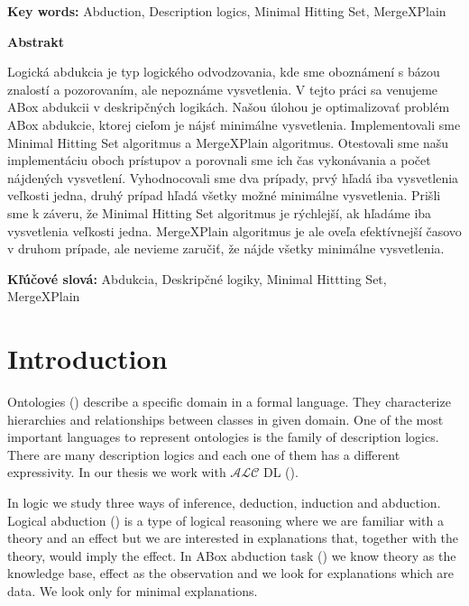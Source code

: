 \documentclass[12pt,a4paper]{article}
\begin{document}
\noindent \textbf{Key words:}
Abduction, Description logics, Minimal Hitting Set, MergeXPlain

\pagebreak
\thispagestyle{empty}
{\large\bf  \noindent Abstrakt \newline} 

Logická abdukcia je typ logického odvodzovania, kde sme oboznámení s bázou znalostí a pozorovaním, ale nepoznáme vysvetlenia. V tejto práci sa venujeme ABox abdukcii v deskripčných logikách. Našou úlohou je optimalizovať problém ABox abdukcie, ktorej cieľom je nájsť minimálne vysvetlenia. Implementovali sme Minimal Hitting Set algoritmus a MergeXPlain algoritmus. Otestovali sme našu implementáciu oboch prístupov a porovnali sme ich čas vykonávania a počet nájdených vysvetlení. Vyhodnocovali sme dva prípady, prvý hľadá iba vysvetlenia veľkosti jedna, druhý prípad hľadá všetky možné minimálne vysvetlenia. Prišli sme k záveru, že Minimal Hitting Set algoritmus je rýchlejší, ak hľadáme iba vysvetlenia veľkosti jedna. MergeXPlain algoritmus je ale oveľa efektívnejší časovo v druhom prípade, ale nevieme zaručiť, že nájde všetky minimálne vysvetlenia. \newline

\noindent \textbf{Kľúčové slová:}
Abdukcia, Deskripčné logiky, Minimal Hittting Set, MergeXPlain

\pagebreak
\thispagestyle{empty}
\tableofcontents
\thispagestyle{empty}

\pagebreak
\thispagestyle{empty}
\listoffigures

\pagebreak
\setcounter{page}{1}
\section{Introduction}
Ontologies (\cite{staabHandbookOntology}) describe a specific domain in a formal language. They characterize hierarchies and relationships between classes in given domain. One of the most important languages to represent ontologies is the family of description logics. There are many description logics and each one of them has a different expressivity. In our thesis we work with $\mathcal{ALC}$ DL (\cite{schmidt1991attributive}).

In logic we study three ways of inference, deduction, induction and abduction. Logical abduction (\cite{peirce}) is a type of logical reasoning where we are familiar with a theory and an effect but we are interested in explanations that, together with the theory, would imply the effect. In ABox abduction task (\cite{Elsenbroich2006}) we know theory as the knowledge base, effect as the observation and we look for explanations which are data. We look only for minimal explanations.
\end{document}
